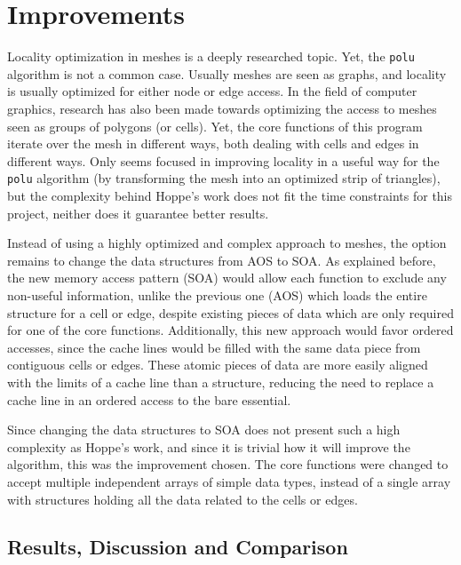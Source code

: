 \documentclass[abstract=on,9pt,twocolumn]{scrartcl}
\begin{document}
\section{Improvements}
\label{sec:soa}
Locality optimization in meshes is a deeply researched topic. Yet, the \texttt{polu} algorithm is not a common case. Usually meshes are seen as graphs, and locality is usually optimized for either node or edge access. In the field of computer graphics, research has also been made towards optimizing the access to meshes seen as groups of polygons (or cells). Yet, the core functions of this program iterate over the mesh in different ways, both dealing with cells and edges in different ways. Only \cite{hoppe99} seems focused in improving locality in a useful way for the \texttt{polu} algorithm (by transforming the mesh into an optimized strip of triangles), but the complexity behind Hoppe's work does not fit the time constraints for this project, neither does it guarantee better results.

Instead of using a highly optimized and complex approach to meshes, the option remains to change the data structures from AOS to SOA. As explained before, the new memory access pattern (SOA) would allow each function to exclude any non-useful information, unlike the previous one (AOS) which loads the entire structure for a cell or edge, despite existing pieces of data which are only required for one of the core functions. Additionally, this new approach would favor ordered accesses, since the cache lines would be filled with the same data piece from contiguous cells or edges. These atomic pieces of data are more easily aligned with the limits of a cache line than a structure, reducing the need to replace a cache line in an ordered access to the bare essential.

Since changing the data structures to SOA does not present such a high complexity as Hoppe's work, and since it is trivial how it will improve the algorithm, this was the improvement chosen. The core functions were changed to accept multiple independent arrays of simple data types, instead of a single array with structures holding all the data related to the cells or edges.



\subsection{Results, Discussion and Comparison}
\end{document}
